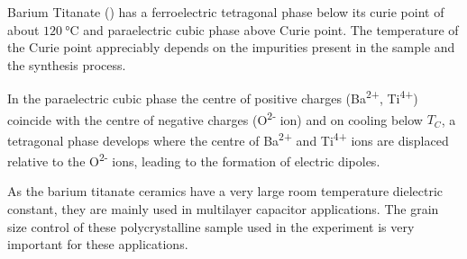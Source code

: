 \documentclass[%
 aip,
 amsmath,amssymb,
 reprint, floatfix%
]{revtex4-1}
\begin{document}
    \par
    Barium Titanate () has a ferroelectric tetragonal phase below its curie point of about $\SI{120}{\celsius}$ and paraelectric cubic phase above Curie point. The temperature of the Curie point appreciably depends on the impurities present in the sample and the synthesis process.
    \par
    In the paraelectric cubic phase the centre of positive charges (Ba\textsuperscript{2+}, Ti\textsuperscript{4+}) coincide with the centre of negative charges (O\textsuperscript{2-} ion) and on cooling below $T_C$, a tetragonal phase develops where the centre of Ba\textsuperscript{2+} and Ti\textsuperscript{4+} ions are displaced relative to the O\textsuperscript{2-} ions, leading to the formation of electric dipoles.
    \par
    As the barium titanate ceramics have a very large room temperature dielectric constant, they are mainly used in multilayer capacitor applications. The grain size control of these polycrystalline sample used in the experiment is very important for these applications.
    
\end{document}
